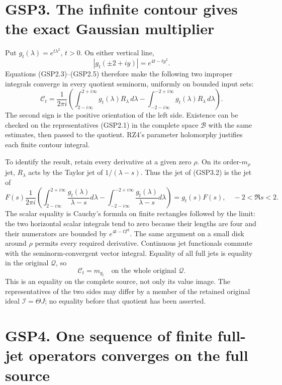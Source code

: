 \section{GSP3. The infinite contour gives the exact Gaussian
multiplier}\label{gsp3.-the-infinite-contour-gives-the-exact-gaussian-multiplier}

Put \(g_t(\lambda)=e^{t\lambda^2}\), \(t>0\). On either vertical line,
\[
|g_t(\pm2+iy)|=e^{4t-ty^2}.
\tag{GSP3.1}
\] Equations (GSP2.3)--(GSP2.5) therefore make the following two
improper integrals converge in every quotient seminorm, uniformly on
bounded input sets: \[
\mathcal C_t=
\frac1{2\pi i}\left(
\int_{2-i\infty}^{2+i\infty}g_t(\lambda)R_\lambda\,d\lambda
-\int_{-2-i\infty}^{-2+i\infty}g_t(\lambda)R_\lambda\,d\lambda
\right).
\tag{GSP3.2}
\] The second sign is the positive orientation of the left side.
Existence can be checked on the representatives (GSP2.1) in the complete
space \(\mathcal B\) with the same estimates, then passed to the
quotient. RZ4's parameter holomorphy justifies each finite contour
integral.

To identify the result, retain every derivative at a given zero
\(\rho\). On its order-\(m_\rho\) jet, \(R_\lambda\) acts by the Taylor
jet of \(1/(\lambda-s)\). Thus the jet of (GSP3.2) is the jet of \[
F(s)\frac1{2\pi i}\left(
\int_{2-i\infty}^{2+i\infty}\frac{g_t(\lambda)}{\lambda-s}d\lambda
-\int_{-2-i\infty}^{-2+i\infty}\frac{g_t(\lambda)}{\lambda-s}d\lambda
\right)
=g_t(s)F(s),\quad -2<\Re s<2.
\tag{GSP3.3}
\] The scalar equality is Cauchy's formula on finite rectangles followed
by the limit: the two horizontal scalar integrals tend to zero because
their lengths are four and their numerators are bounded by
\(e^{4t-tT^2}\). The same argument on a small disk around \(\rho\)
permits every required derivative. Continuous jet functionals commute
with the seminorm-convergent vector integral. Equality of all full jets
is equality in the original \(\mathcal Q\), so \[
\boxed{\mathcal C_t=m_{g_t}\quad\text{on the whole original }\mathcal Q.}
\tag{GSP3.4}
\] This is an equality on the complete source, not only its value image.
The representatives of the two sides may differ by a member of the
retained original ideal \(\mathcal I=\Theta J\); no equality before that
quotient has been asserted.

\section{GSP4. One sequence of finite full-jet operators converges on
the full
source}\label{gsp4.-one-sequence-of-finite-full-jet-operators-converges-on-the-full-source}

